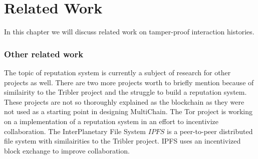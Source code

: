 \chapter{Related Work}
In this chapter we will discuss related work on tamper-proof interaction histories.





\subsection{Other related work}
The topic of reputation system is currently a subject of research for other projects as well.
There are two more projects worth to briefly mention because of similairity to the Tribler project
and the struggle to build a reputation system.
These projects are not so thoroughly explained as the blockchain
as they were not used as a starting point in designing MultiChain.
The Tor project is working on a implementation of a reputation system
in an effort to incentivize collaboration\cite{androulaki-torincentive}\cite{chen-torincentive}\cite{dingledine-torincentive}\cite{ghosh-torincentive}\cite{jansen-torincentive}.
The InterPlanetary File System \(IPFS\) is a peer-to-peer distributed file system with similairities to the Tribler project.
IPFS uses an incentivized block exchange to improve collaboration\cite{benet-ipfs}.